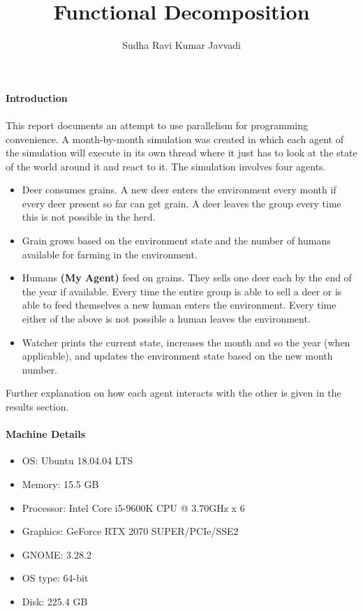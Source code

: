 \documentclass[notitlepage]{report}
\title{Functional Decomposition}
\author{Sudha Ravi Kumar Javvadi}
\begin{document}
	\maketitle
	\paragraph{Introduction}
	\paragraph{} This report documents an attempt to use parallelism for programming convenience. A month-by-month simulation was created in which each agent of the simulation will execute in its own thread where it just has to look at the state of the world around it and react to it. The simulation involves four agents.
	\begin{itemize}
		\item{Deer} consumes grains. A new deer enters the environment every month if every deer present so far can get grain. A deer leaves the group every time this is not possible in the herd.
		\item{Grain} grows based on the environment state and the number of humans available for farming in the environment.
		\item{Humans \textbf{(My Agent)}} feed on grains. They sells one deer each by the end of the year if available. Every time the entire group is able to sell a deer or is able to feed themselves a new human enters the environment. Every time either of the above is not possible a human leaves the environment.
		\item{Watcher} prints the current state, increases the month and so the year (when applicable), and updates the environment state based on the new month number.
	\end{itemize}
	Further explanation on how each agent interacts with the other is given in the results section.
	\paragraph{Machine Details}
	\begin{itemize}
		\item{OS}: Ubuntu 18.04.04 LTS
		\item{Memory}: 15.5 GB
		\item{Processor}: Intel Core i5-9600K CPU @ 3.70GHz x 6
		\item{Graphics}: GeForce RTX 2070 SUPER/PCIe/SSE2
		\item{GNOME}: 3.28.2
		\item{OS type}: 64-bit
		\item{Disk}: 225.4 GB
	\end{itemize}
\end{document}
